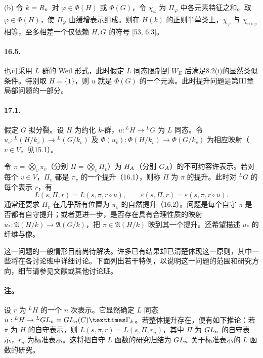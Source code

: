 (b) 令 $k=R$。对 $\varphi\in\Phi(H)$ 或 $\Phi(G)$，令 $\chi_\varphi$ 为 $\Pi_\varphi$ 中各元素特征之和。取 $\varphi\in\Phi(H)$，使 $\Pi_\varphi$ 由缓增表示组成。则在 $H(k)$ 的正则半单类上，$\chi_\varphi$ 与 $\chi_{u\circ\varphi}$ 相等，至多相差一个仅依赖 $H,G$ 的符号 [53, 6.3]。

\paragraph*{16.5.} 也可采用 $L$ 群的 Weil 形式，此时假定 $L$ 同态限制到 $W_E$ 后满足8.2(i)的显然类似条件。特别取 $H=\{1\}$，则 $u$ 就是 $\Phi(G)$ 的一个元素。此时提升问题是第III章局部问题的一部分。

\paragraph*{17.1.} 假定 $G$ 拟分裂。设 $H$ 为约化 $k$-群，$u:{}^LH\to{}^LG$ 为 $L$ 同态。令 $u_v:{}^L(H/k_v)\to{}^L(G/k_v)$ 及 $\Phi(u_v):\Phi(H/k_v)\to\Phi(G/k_v)$ 为相应映射（$v\in V$，见15.1）。

令 $\pi=\bigotimes_v\pi_v$（分别 $\Pi=\bigotimes_v\Pi_v$）为 $H_{A}$（分别 $G_{A}$）的不可约容许表示。若对每个 $v\in V$，$\Pi_v$ 都是 $\pi_v$ 的一个提升（16.1），则称 $\Pi$ 为 $\pi$ 的提升。此时对 ${}^LG$ 的每个表示 $r$，有
\begin{equation}
 L(s,\Pi,r)=L(s,\pi,r\circ u),\qquad
 \varepsilon(s,\Pi,r)=\varepsilon(s,\pi,r\circ u).\tag{1}
\end{equation}
通常还要求 $\Pi_v$ 在几乎所有位置为 $\pi_v$ 的自然提升（16.2）。问题是每个自守 $\pi$ 是否都有自守提升；或者更进一步，是否存在具有合理性质的映射 $u_*:\mathfrak A(H/k)\to\mathfrak A(G/k)$，把 $\pi\in\mathfrak A(H/k)$ 映到其一个提升。还希望描述 $u_*$ 的纤维与像。

这一问题的一般情形目前尚待解决。许多已有结果却已清楚体现这一原则，其中一些将在各讨论班中详细讨论。下面列出若干特例，以说明这一问题的范围和研究方向，细节请参见文献或其他讨论班。

\paragraph*{注。} 设 $r$ 为 ${}^LH$ 的一个 $n$ 次表示。它显然确定 $L$ 同态 $u:{}^LH\to{}^L\GL_n=\GL_n(\C)\times\Gamma_k$。若整体提升存在，便有如下推论：若 $\pi$ 为 $H$ 的自守表示，则 $L(s,\pi,r)=L(s,\Pi,r_n)$，其中 $\Pi$ 为 $GL_n$ 的自守表示，$r_n$ 为标准表示。这将把自守 $L$ 函数的研究归结为 $GL_n$ 关于标准表示的 $L$ 函数的研究。

